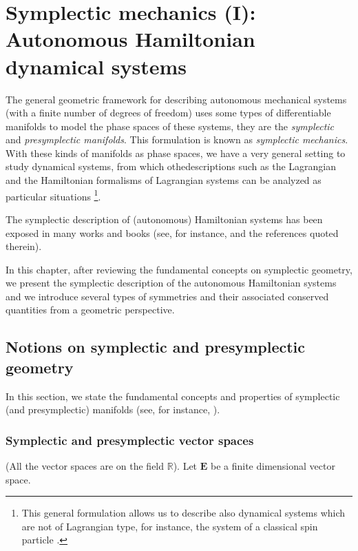 \documentclass[12pt]{report}
\def\Real{\mathbb{R}}
\begin{document}
\chapter{Symplectic mechanics (I): Autonomous Hamiltonian dynamical systems}
\label{ch2}



The general geometric framework for describing autonomous mechanical systems (with a finite number of degrees of freedom)
uses some types of differentiable manifolds to model the phase spaces of these systems,
they are the {\sl symplectic} and {\sl presymplectic manifolds}.
This formulation is known as {\sl symplectic mechanics}. With these kinds of manifolds as phase spaces, 
we have a very general setting to study dynamical systems,
from which othedescriptions such as the Lagrangian and the Hamiltonian formalisms of Lagrangian systems can be analyzed as particular situations
\footnote{
This general formulation allows us to describe also
dynamical systems which are not of Lagrangian type,
for instance, the system of a classical spin particle \cite{So-ssd}.}.

The symplectic description of (autonomous) Hamiltonian systems has been exposed in many works and books
(see, for instance, \cite{AM-78,Ar-89,dLe89,art:Krupkova00,LM-sgam,Li-75,MR-99,So-ssd,We-77} and the references quoted therein).

In this chapter, after reviewing the fundamental concepts on symplectic geometry,
we present the symplectic description of the autonomous Hamiltonian systems
and we introduce several types of symmetries and their associated conserved quantities
from a geometric perspective.



\section{Notions on symplectic and presymplectic geometry}
\label{sympgeom}


In this section, we state the fundamental concepts and properties 
of symplectic (and presymplectic) manifolds
(see, for instance, \cite{AM-78,ABKLR-2012,CdS-2008,GS-77,LM-sgam,We-77}).


\subsection{Symplectic and presymplectic vector spaces}

(All the vector spaces are on the field $\Real$).
Let $\textbf{E}$ be a finite dimensional vector space.
\end{document}
